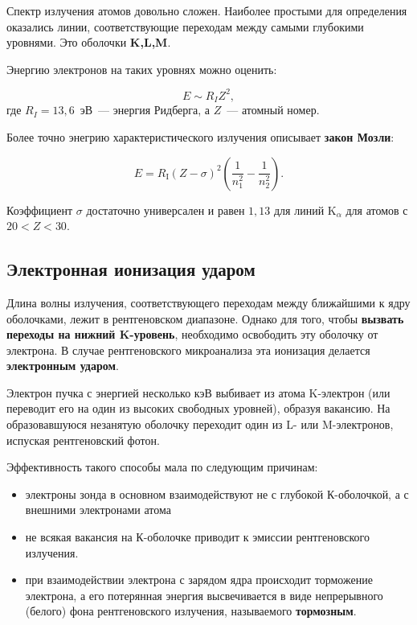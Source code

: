 \documentclass[12pt]{article}
\begin{document}
Спектр излучения атомов довольно сложен. Наиболее простыми для определения оказались линии, соответствующие переходам между самыми глубокими уровнями. Это оболочки \textbf{K,L,M}.


Энергию электронов на таких уровнях можно оценить:

\[
E \sim R_I Z^2, \tag{4}
\]
где $R_I = 13{,}6$~эВ~--- энергия Ридберга, а $Z$~--- атомный номер.

Более точно энегрию характеристического излучения описывает \textbf{закон Мозли}:

\[
E = R_{\mathrm{I}} (Z - \sigma)^2 \left( \frac{1}{n_1^2} - \frac{1}{n_2^2} \right).\tag{5}
\]

Коэффициент $\sigma$ достаточно универсален и равен $1{,}13$ для линий K$_\alpha$ для атомов с $20 < Z < 30$.

\newpage

\subsection{Электронная ионизация ударом}

Длина волны излучения, соответствующего переходам между ближайшими к ядру оболочками, лежит в рентгеновском диапазоне. Однако для того, чтобы \textbf{вызвать переходы на нижний K-уровень}, необходимо освободить эту оболочку от электрона. В случае рентгеновского микроанализа эта ионизация делается \textbf{электронным ударом}.


Электрон пучка с энергией несколько кэВ выбивает из атома K-электрон (или переводит его на один из высоких свободных уровней), образуя вакансию. На образовавшуюся незанятую оболочку переходит один из L- или M-электронов, испуская рентгеновский фотон.

Эффективность такого способы мала по следующим причинам:

\begin{itemize}
  \item  электроны зонда в основном взаимодействуют не с глубокой К-оболочкой, а с внешними электронами атома
  \item  не всякая вакансия на К-оболочке приводит к эмиссии рентгеновского излучения.
  \item  при взаимодействии электрона с зарядом ядра происходит торможение электрона, а его потерянная энергия высвечивается в виде непрерывного (белого) фона рентгеновского излучения, называемого \textbf{тормозным}. 
\end{itemize}
\end{document}
